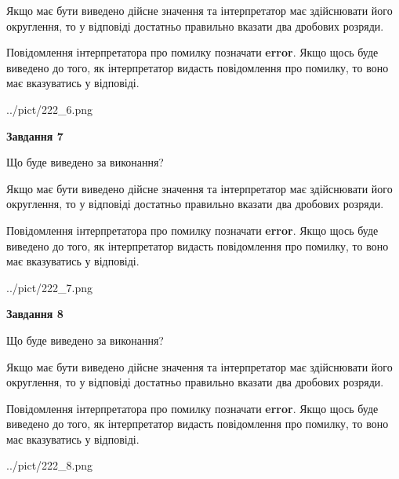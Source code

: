 \documentclass[12pt, ukrainian]{article}
\begin{document}
{\begin {Large}
Якщо має бути виведено дійсне значення та інтерпретатор має здійснювати його округлення, 
то у відповіді достатньо правильно вказати два дробових розряди.

Повідомлення інтерпретатора про помилку позначати \textbf{error}.
Якщо щось буде виведено до того, як інтерпретатор видасть повідомлення про помилку, 
то воно має вказуватись у відповіді. \par

\begin{center}
	{../pict/222_6.png}
\end{center}
\newpage

{\begin {center}\textbf{Завдання 7}\end {center}}\par
Що буде виведено за виконання? \par

Якщо має бути виведено дійсне значення та інтерпретатор має здійснювати його округлення, 
то у відповіді достатньо правильно вказати два дробових розряди.

Повідомлення інтерпретатора про помилку позначати \textbf{error}.
Якщо щось буде виведено до того, як інтерпретатор видасть повідомлення про помилку, 
то воно має вказуватись у відповіді. \par

\begin{center}
	{../pict/222_7.png}
\end{center}
\newpage

{\begin {center}\textbf{Завдання 8}\end {center}}\par
Що буде виведено за виконання? \par

Якщо має бути виведено дійсне значення та інтерпретатор має здійснювати його округлення, 
то у відповіді достатньо правильно вказати два дробових розряди.

Повідомлення інтерпретатора про помилку позначати \textbf{error}.
Якщо щось буде виведено до того, як інтерпретатор видасть повідомлення про помилку, 
то воно має вказуватись у відповіді. \par

\begin{center}
	{../pict/222_8.png}
\end{center}
\newpage


\end{Large}}
\end{document}
